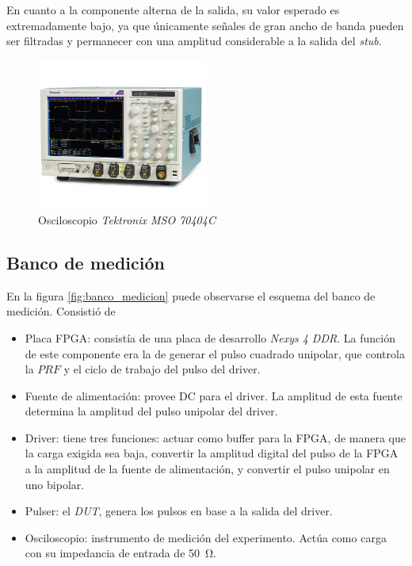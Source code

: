 En cuanto a la componente alterna de la salida, su valor esperado es
extremadamente bajo, ya que únicamente señales de gran ancho de banda pueden ser
filtradas y permanecer con una amplitud considerable a la salida del 
\textit{stub}.

\begin{figure}
  \centering
    \includegraphics[width=0.5\textwidth]{images/osciloscopio.png}
    \caption{Osciloscopio \textit{Tektronix MSO 70404C}}
    \label{fig:osciloscopio}
\end{figure}

\subsection{Banco de medición}

En la figura \ref{fig:banco_medicion} puede observarse el esquema del banco de
medición. Consistió de

\begin{itemize}
    \item Placa FPGA: consistía de una placa de desarrollo \textit{Nexys 4 DDR}.
      La función de este componente era la de generar el pulso cuadrado
      unipolar, que controla la $PRF$ y el ciclo de trabajo del pulso del driver.
    \item Fuente de alimentación: provee DC para el driver. La amplitud de esta
        fuente determina la amplitud del pulso unipolar del driver.
    \item Driver: tiene tres funciones: actuar como buffer para la FPGA, de
        manera que la carga exigida sea baja, convertir la amplitud digital del
        pulso de la FPGA a la amplitud de la fuente de alimentación, y convertir
        el pulso unipolar en uno bipolar.
    \item Pulser: el \textit{DUT}, genera los pulsos en base a la salida del driver.
    \item Osciloscopio: instrumento de medición del experimento. Actúa como
      carga con su impedancia de entrada de \qty{50}{\ohm}.
\end{itemize}

